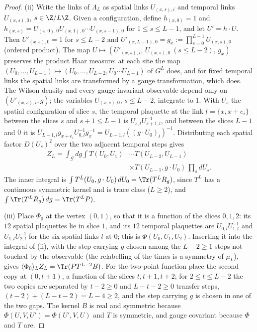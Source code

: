 \begin{proof}
(ii) Write the links of $\Lambda_L$ as spatial links $U_{(x,s),i}$ and
temporal links $U_{(x,s),0}$, $s\in\Z/L\Z$. Given a configuration, define
$h_{(x,0)}=1$ and $h_{(x,s)}=U_{(x,0),0}U_{(x,1),0}\cdots U_{(x,s-1),0}$
for $1\le s\le L-1$, and let $U'=h\cdot U$. Then $U'_{(x,s),0}=1$ for
$s\le L-2$ and $U'_{(x,L-1),0}=g_x:=\prod_{s=0}^{L-1}U_{(x,s),0}$ (ordered
product). The map $U\mapsto(U'_{(x,s),i},\,U_{(x,s),0}\ (s\le L-2),\,g_x)$
preserves the product Haar measure: at each site the map $(U_0,\dots,U_{
L-1})\mapsto(U_0,\dots,U_{L-2},U_0\cdots U_{L-1})$ of $G^L$ does, and for
fixed temporal links the spatial links are transformed by a gauge
transformation, which does. The Wilson density and every gauge-invariant
observable depend only on $(U'_{(x,s),i},g)$; the variables $U_{(x,s),0}$,
$s\le L-2$, integrate to $1$. With $U_s$ the spatial configuration of
slice $s$, the temporal plaquette at the link $l=\{x,x+e_i\}$ between the
slices $s$ and $s+1\le L-1$ is $U_{s,l}U_{s+1,l}^{-1}$, and between the
slices $L-1$ and $0$ it is $U_{L-1,l}g_{x+e_i}U_{0,l}^{-1}g_x^{-1}=U_{L-1,l}
((g\cdot U_0)_l)^{-1}$. Distributing each spatial factor $D(U_s)^2$ over
the two adjacent temporal steps gives
\begin{align*}
Z_L=\int_{\mathcal G}dg\int T(U_0,U_1)&\cdots T(U_{L-2},U_{L-1})\\
&\times T(U_{L-1},g\cdot U_0)\,\prod_sdU_s .
\end{align*}
The inner integral is $\int T^L(U_0,g\cdot U_0)\,dU_0=\Tr(T^LR_g)$, since
$T^L$ has a continuous symmetric kernel and is trace class ($L\ge2$), and
$\int\Tr(T^LR_g)\,dg=\Tr(T^LP)$.

(iii) Place $\Phi_0$ at the vertex $(0,1)$, so that it is a function of
the slices $0,1,2$: its $12$ spatial plaquettes lie in slice $1$, and its
$12$ temporal plaquettes are $U_{0,l}U_{1,l}^{-1}$ and $U_{1,l}U_{2,l}^{-1}$
for the six spatial links $l$ at $0$; this is $\Phi(U_0,U_1,U_2)$. Inserting
it into the integral of (ii), with the step carrying $g$ chosen among the
$L-2\ge1$ steps not touched by the observable (the relabelling of the
times is a symmetry of $\mu_L$), gives $\langle\Phi_0\rangle_LZ_L=
\Tr(PT^{L-2}B)$. For the two-point function place the second copy at
$(0,t+1)$, a function of the slices $t,t+1,t+2$; for $2\le t\le L-2$ the
two copies are separated by $t-2\ge0$ and $L-t-2\ge0$ transfer steps,
$(t-2)+(L-t-2)=L-4\ge2$, and the step carrying $g$ is chosen in one of the
two gaps. The kernel $B$ is real and symmetric because $\Phi(U,V,U')=
\Phi(U',V,U)$ and $T$ is symmetric, and gauge covariant because $\Phi$ and
$T$ are.
\end{proof}

